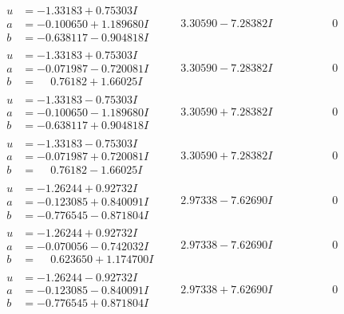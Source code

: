 \documentclass[1p]{elsarticle_modified}
\theoremstyle{definition}
\begin{document}
$$\begin{array}{c|c|c}
\begin{aligned}
u &= -1.33183 + 0.75303 I \\
a &= -0.100650 + 1.189680 I \\
b &= -0.638117 - 0.904818 I\end{aligned}
 & \phantom{-}3.30590 - 7.28382 I & \phantom{-0.000000 } 0 \\ \hline\begin{aligned}
u &= -1.33183 + 0.75303 I \\
a &= -0.071987 - 0.720081 I \\
b &= \phantom{-}0.76182 + 1.66025 I\end{aligned}
 & \phantom{-}3.30590 - 7.28382 I & \phantom{-0.000000 } 0 \\ \hline\begin{aligned}
u &= -1.33183 - 0.75303 I \\
a &= -0.100650 - 1.189680 I \\
b &= -0.638117 + 0.904818 I\end{aligned}
 & \phantom{-}3.30590 + 7.28382 I & \phantom{-0.000000 } 0 \\ \hline\begin{aligned}
u &= -1.33183 - 0.75303 I \\
a &= -0.071987 + 0.720081 I \\
b &= \phantom{-}0.76182 - 1.66025 I\end{aligned}
 & \phantom{-}3.30590 + 7.28382 I & \phantom{-0.000000 } 0 \\ \hline\begin{aligned}
u &= -1.26244 + 0.92732 I \\
a &= -0.123085 + 0.840091 I \\
b &= -0.776545 - 0.871804 I\end{aligned}
 & \phantom{-}2.97338 - 7.62690 I & \phantom{-0.000000 } 0 \\ \hline\begin{aligned}
u &= -1.26244 + 0.92732 I \\
a &= -0.070056 - 0.742032 I \\
b &= \phantom{-}0.623650 + 1.174700 I\end{aligned}
 & \phantom{-}2.97338 - 7.62690 I & \phantom{-0.000000 } 0 \\ \hline\begin{aligned}
u &= -1.26244 - 0.92732 I \\
a &= -0.123085 - 0.840091 I \\
b &= -0.776545 + 0.871804 I\end{aligned}
 & \phantom{-}2.97338 + 7.62690 I & \phantom{-0.000000 } 0 \\ \hline\begin{aligned}

\end{aligned}
\end{array}$$
\end{document}
